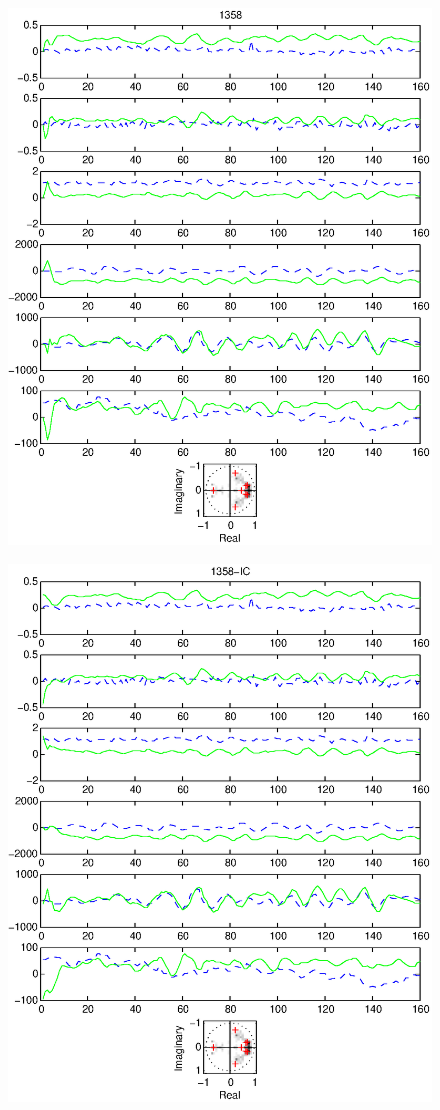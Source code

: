\documentclass{article}
\begin{document}
\begin{figure}[htb!]
\centering
\includegraphics{1358.eps}
\end{figure}\clearpage
\begin{figure}[htb!]
\centering
\includegraphics{1358_ic.eps}
\end{figure}\clearpage
\end{document}

